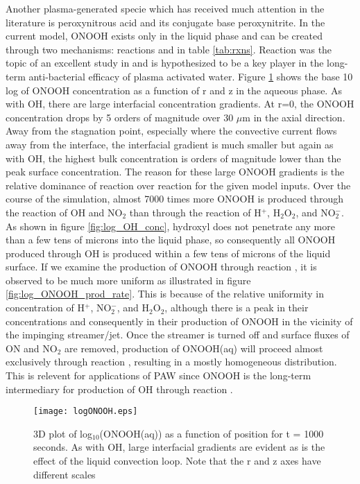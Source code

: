 Another plasma-generated specie which has received much attention in the literature is peroxynitrous acid and its conjugate base peroxynitrite. In the current model, ONOOH exists only in the liquid phase and can be created through two mechanisms: reactions \ONOOHlong{} and \ONOOHshort{} in table \ref{tab:rxns}. Reaction \ONOOHlong{} was the topic of an excellent study in \cite{Lukes2014b} and is hypothesized to be a key player in the long-term anti-bacterial efficacy of plasma activated water. Figure \ref{fig:log_ONOOH_conc} shows the base 10 log of ONOOH concentration as a function of r and z in the aqueous phase. As with OH, there are large interfacial concentration gradients. At r=0, the ONOOH concentration drops by 5 orders of magnitude over 30 $\mu$m in the axial direction. Away from the stagnation point, especially where the convective current flows away from the interface, the interfacial gradient is much smaller but again as with OH, the highest bulk concentration is orders of magnitude lower than the peak surface concentration. The reason for these large ONOOH gradients is the relative dominance of reaction \ONOOHshort{} over reaction \ONOOHlong{} for the given model inputs. Over the course of the simulation, almost 7000 times more ONOOH is produced through the reaction of OH and NO$_2$ than through the reaction of H$^+$, H$_2$O$_2$, and NO$_2^-$. As shown in figure \ref{fig:log_OH_conc}, hydroxyl does not penetrate any more than a few tens of microns into the liquid phase, so consequently all ONOOH produced through OH is produced within a few tens of microns of the liquid surface. If we examine the production of ONOOH through reaction \ONOOHlong{}, it is observed to be much more uniform as illustrated in figure \ref{fig:log_ONOOH_prod_rate}. This is because of the relative uniformity in concentration of H$^+$, NO$_2^-$, and H$_2$O$_2$, although there is a peak in their concentrations and consequently in their production of ONOOH in the vicinity of the impinging streamer/jet. Once the streamer is turned off and surface fluxes of ON and NO$_2$ are removed, production of ONOOH(aq) will proceed almost exclusively through reaction \ONOOHlong{}, resulting in a mostly homogeneous distribution. This is relevent for applications of PAW since ONOOH is the long-term intermediary for production of OH through reaction \OHfromONOOH{}.

\begin{figure}[htb]
    \centering
    \texttt{[image: logONOOH.eps]}
    \caption{3D plot of log$_{10}$(ONOOH(aq)) as a function of position for t = 1000 seconds. As with OH, large interfacial gradients are evident as is the effect of the liquid convection loop. Note that the r and z axes have different scales}
    \label{fig:log_ONOOH_conc}
\end{figure}

